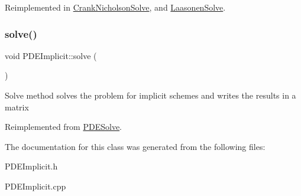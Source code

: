 Reimplemented in \hyperlink{class_crank_nicholson_solve_a82fe6f2538bc90d62842d26736ba8707}{Crank\+Nicholson\+Solve}, and \hyperlink{class_laasonen_solve_af320ccb100c388621052d2a2cb57858a}{Laasonen\+Solve}.

\mbox{\label{class_p_d_e_implicit_ace06b1a56c2766ca8d4bc95669d21d12}} 
\subsubsection{\texorpdfstring{solve()}{solve()}}
{\footnotesize\ttfamily void P\+D\+E\+Implicit\+::solve (\begin{DoxyParamCaption}{ }\end{DoxyParamCaption})\hspace{0.3cm}{\ttfamily [virtual]}}

Solve method solves the problem for implicit schemes and writes the results in a matrix 

Reimplemented from \hyperlink{class_p_d_e_solve_a2fb309c3e7f35de2f639596f7fcb17cc}{P\+D\+E\+Solve}.



The documentation for this class was generated from the following files\+:\begin{DoxyCompactItemize}
\item 
P\+D\+E\+Implicit.\+h\item 
P\+D\+E\+Implicit.\+cpp\end{DoxyCompactItemize}
